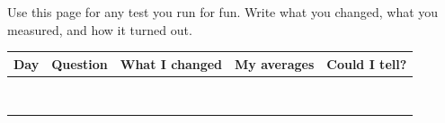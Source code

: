 \thispagestyle{fancy}
Use this page for any test you run for fun. Write what you changed, what you measured, and how it turned out.
\renewcommand{\arraystretch}{2.4}
\begin{center}\sffamily\scriptsize
\begin{tabularx}{\textwidth}{|p{1.3cm}|X|X|X|X|}
\hline
\textbf{Day} & \textbf{Question} & \textbf{What I changed} & \textbf{My averages} & \textbf{Could I tell?}\\ \hline
 & & & & \\ \hline
 & & & & \\ \hline
 & & & & \\ \hline
 & & & & \\ \hline
 & & & & \\ \hline
 & & & & \\ \hline
 & & & & \\ \hline
 & & & & \\ \hline
\end{tabularx}
\end{center}
\clearpage
